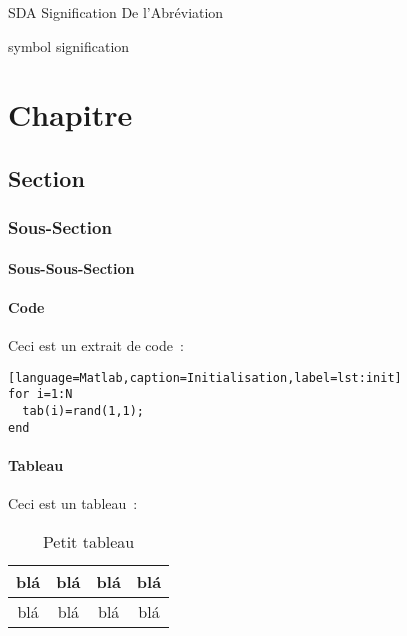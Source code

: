 \documentclass [memoire, letterpaper, oneside, 12pt]{thETS-utf8}
\begin{document}
\begin{listofabbr}[3cm]
\item[SDA] Signification De l'Abréviation
\end{listofabbr}

\begin{listofsymbols}[3cm]
\item[symbol] signification
\end{listofsymbols}

\newpage
{}

\reversemarginpar %

\begin{introduction}

\end{introduction}

\chapter{Chapitre}
\section{Section}
\subsection{Sous-Section}
\subsubsection{Sous-Sous-Section}

\subsubsection{Code}
Ceci est un extrait de code~:
\begin{lstlisting}
[language=Matlab,caption=Initialisation,label=lst:init]
for i=1:N
  tab(i)=rand(1,1);
end
\end{lstlisting}

\subsubsection{Tableau}
Ceci est un tableau~:
\begin{table}[ht]
  \caption{Petit tableau}
  \begin{tabular}{|c|c|c|c|}\hline
      blá & blá & blá & blá \\\hline
      blá & blá & blá & blá \\\hline
  \end{tabular}
  \label{tab:UnTableau}
\end{table}
\end{document}
